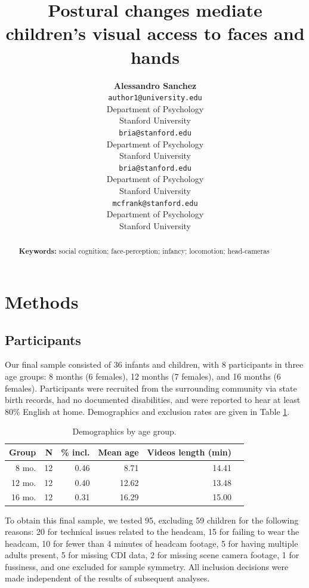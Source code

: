 \documentclass[10pt, letterpaper]{article}
\title{Postural changes mediate children's visual access to faces and hands}
\author{{\large \bf Alessandro Sanchez} \\ \texttt{author1@university.edu} \\ Department of Psychology \\ Stanford University \And {\large \bf Bria Long} \\ \texttt{bria@stanford.edu} \\ Department of Psychology \\ Stanford University
    \And {\large \bf Ally Kraus} \\ \texttt{bria@stanford.edu} \\ Department of Psychology \\ Stanford University
    \And {\large \bf Michael C. Frank} \\ \texttt{mcfrank@stanford.edu} \\ Department of Psychology \\ Stanford University}
\begin{document}
\maketitle

\begin{abstract}


\textbf{Keywords:}
social cognition; face-perception; infancy; locomotion; head-cameras
\end{abstract}

\section{Methods}\label{methods}

\subsection{Participants}\label{participants}

Our final sample consisted of 36 infants and children, with 8
participants in three age groups: 8 months (6 females), 12 months (7
females), and 16 months (6 females). Participants were recruited from
the surrounding community via state birth records, had no documented
disabilities, and were reported to hear at least 80\% English at home.
Demographics and exclusion rates are given in Table \ref{tab:pop}.

\begin{table}[H]
\centering
\begin{tabular}{rrrrrr}
  \hline
 Group & N & \% incl. & Mean age & Videos length (min) \\ 
  \hline
   8 mo. &   12 & 0.46 & 8.71 & 14.41 \\ 
   12 mo. &  12 & 0.40 & 12.62 & 13.48 \\ 
   16 mo. &  12 & 0.31 & 16.29 & 15.00\\ 
   \hline
\end{tabular}
\caption{\label{tab:pop} Demographics by age group.}
\end{table}

To obtain this final sample, we tested 95, excluding 59 children for the
following reasons: 20 for technical issues related to the headcam, 15
for failing to wear the headcam, 10 for fewer than 4 minutes of headcam
footage, 5 for having multiple adults present, 5 for missing CDI data, 2
for missing scene camera footage, 1 for fussiness, and one excluded for
sample symmetry. All inclusion decisions were made independent of the
results of subsequent analyses.
\end{document}
